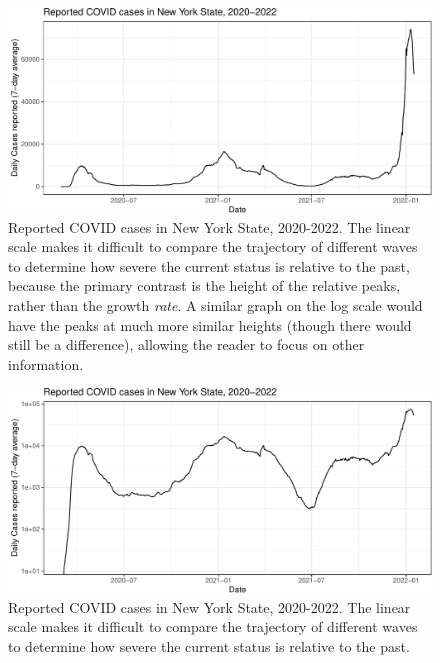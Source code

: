 \documentclass[article]{jdssv}\usepackage[]{graphicx}\usepackage[]{color}
\newenvironment{knitrout}{}{} %
\begin{document}
\begin{knitrout}\footnotesize
{}\color{fgcolor}\begin{figure}

{\centering \includegraphics[width=.8\linewidth]{Figures_R/fig-linear-scales-ref-lines-1} 

}

\caption[Reported COVID cases in New York State, 2020-2022]{Reported COVID cases in New York State, 2020-2022. The linear scale makes it difficult to compare the trajectory of different waves to determine how severe the current status is relative to the past, because the primary contrast is the height of the relative peaks, rather than the growth \emph{rate}. A similar graph on the log scale would have the peaks at much more similar heights (though there would still be a difference), allowing the reader to focus on other information.}\label{fig:linear-scales-ref-lines}
\end{figure}

\end{knitrout}


\begin{knitrout}\footnotesize
{}\color{fgcolor}\begin{figure}

{\centering \includegraphics[width=.8\linewidth]{Figures_R/fig-log-scales-ref-lines-1} 

}

\caption[Reported COVID cases in New York State, 2020-2022]{Reported COVID cases in New York State, 2020-2022. The linear scale makes it difficult to compare the trajectory of different waves to determine how severe the current status is relative to the past.}\label{fig:log-scales-ref-lines}
\end{figure}

\end{knitrout}
\end{document}
